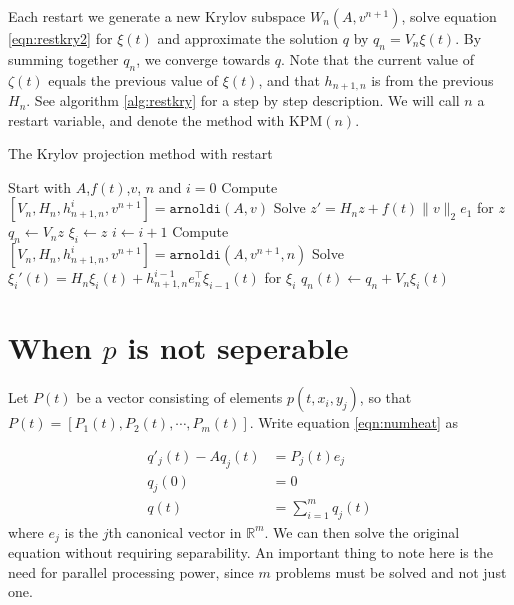 Each restart we generate a new Krylov subspace $W_n(A,v^{n+1})$, solve equation \eqref{eqn:restkry2} for $\xi(t)$ and approximate the solution $q$ by $ q_n =  V_n\xi(t)$. By summing together $q_n$, we converge towards $q$. Note that the current value of $\zeta(t)$ equals the previous value of $\xi(t)$, and that $h_{n+1,n}$ is from the previous $H_n$. See algorithm \ref{alg:restkry} for a step by step description. We will call $n$ a restart variable, and denote the method with KPM$(n)$.
\begin{algorithm}
\begin{algorithmic} \caption{The Krylov projection method with restart} \label{alg:restkry} 
\STATE Start with $A$,$f(t)$,$v$, $n$ and $i = 0$
\STATE Compute $[V_n,H_n,h_{n+1,n}^i,v^{n+1}] = \texttt{arnoldi}(A,v)$
\STATE Solve $  z' = H_n z + f(t) \| v \|_2 e_1  $ for $z$
\STATE $ q_n \leftarrow  V_n z $
\STATE $\xi_i \leftarrow z$
    \STATE $i \leftarrow i + 1$
    \STATE Compute $[V_n,H_n,h_{n+1,n}^i,v^{n+1}] = \texttt{arnoldi}(A,v^{n+1},n)$
    \STATE Solve $ \xi_i'(t) = H_n \xi_i(t) + h_{n+1,n}^{i-1}e_n^\top \xi_{i-1}(t)  $ for $\xi_i$
    \STATE $ q_n(t) \leftarrow q_n + V_n \xi_i(t) $
\ENDWHILE
\end{algorithmic} 
\end{algorithm}

\section{When $p$ is not seperable} \label{sec:nonsep}
Let $P(t)$ be a vector consisting of elements $p(t, x_i, y_j)$, so that $P(t) = [P_1(t),P_2(t),\cdots, P_m(t)]$. Write equation \eqref{eqn:numheat} as

\begin{equation}
\begin{aligned}
q'_j(t) -A q_j(t) &= P_j(t) e_j \\
q_j(0) &= 0\\
q(t) &= \sum \limits_{i = 1}^m q_j(t)
\end{aligned}
\end{equation}
where $e_j$ is the $j$th canonical vector in $\mathbb{R}^{m}$. We can then solve the original equation without requiring separability. 
An important thing to note here is the need for parallel processing power, since $m$ problems must be solved and not just one.
